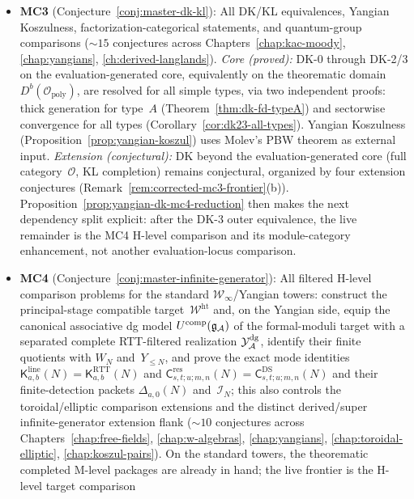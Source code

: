 \begin{remark}
\begin{itemize}
\item \textbf{MC3} (Conjecture~\ref{conj:master-dk-kl}):
  All DK/KL equivalences, Yangian Koszulness, factorization-categorical
  statements, and quantum-group comparisons (${\sim}15$ conjectures
  across Chapters~\ref{chap:kac-moody}, \ref{chap:yangians},
  \ref{ch:derived-langlands}).
  \emph{Core (proved):} DK-0 through DK-2/3 on the
  evaluation-generated core, equivalently on the theorematic domain
  $D^b(\mathcal{O}_{\mathrm{poly}})$, are resolved for all simple
  types, via two independent proofs: thick generation for
  type~$A$ (Theorem~\ref{thm:dk-fd-typeA}) and sectorwise
  convergence for all types
  (Corollary~\ref{cor:dk23-all-types}).
  Yangian Koszulness (Proposition~\ref{prop:yangian-koszul})
  uses Molev's PBW theorem \cite{molev-yangians} as external input.
  \emph{Extension (conjectural):} DK beyond the evaluation-generated
  core (full category~$\mathcal{O}$, KL completion) remains conjectural,
  organized by four extension conjectures
  (Remark~\ref{rem:corrected-mc3-frontier}(b)).
  Proposition~\ref{prop:yangian-dk-mc4-reduction}
  then makes the next dependency split explicit: after the DK-3 outer
  equivalence, the live remainder is the MC4 H-level comparison and its
  module-category enhancement, not another evaluation-locus
  comparison.
\item \textbf{MC4} (Conjecture~\ref{conj:master-infinite-generator}):
  All filtered H-level comparison problems for the standard
  $\mathcal{W}_\infty$/Yangian towers: construct the principal-stage
  compatible target~$\mathcal{W}^{\mathrm{ht}}$ and, on the Yangian
  side, equip the canonical associative dg model
  $U^{\mathrm{comp}}(\mathfrak{g}_{\mathcal{A}})$ of the formal-moduli target
  with a separated complete RTT-filtered realization
  $\mathcal{Y}^{\mathrm{dg}}_{\mathcal{A}}$, identify their finite quotients with $W_N$
  and~$Y_{\le N}$, and prove the exact mode
  identities
  $\mathsf{K}^{\mathrm{line}}_{a,b}(N)
  =\mathsf{K}^{\mathrm{RTT}}_{a,b}(N)$ and
  $\mathsf{C}^{\mathrm{res}}_{s,t;u;m,n}(N)
  =\mathsf{C}^{\mathrm{DS}}_{s,t;u;m,n}(N)$
  and their finite-detection packets
  $\Delta_{a,0}(N)$ and~$\mathcal{I}_N$; this also controls the
  toroidal/elliptic comparison extensions and the distinct
  derived/super infinite-generator extension flank
  (${\sim}10$ conjectures across Chapters~\ref{chap:free-fields},
  \ref{chap:w-algebras}, \ref{chap:yangians},
  \ref{chap:toroidal-elliptic}, \ref{chap:koszul-pairs}).  On the
  standard towers, the theorematic completed M-level packages are
  already in hand; the live frontier is the H-level target comparison

\end{itemize}
\end{remark}
